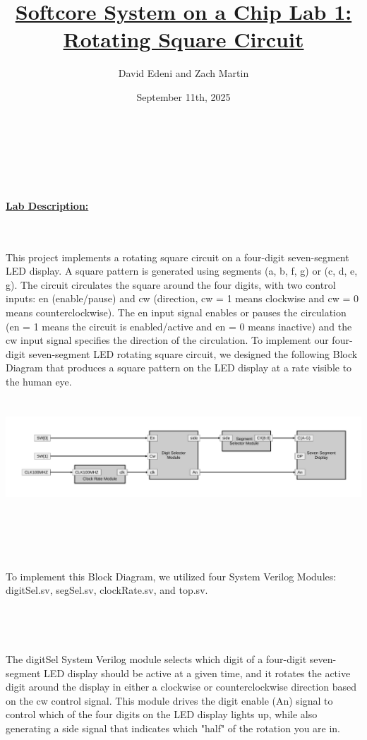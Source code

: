\documentclass[12pt, letterpaper]{article}
\title{
    \underline{\textbf{Softcore System on a Chip Lab 1:}}
    \underline{\textbf{Rotating Square Circuit}} %
   }
\author{David Edeni and Zach Martin}
\date{September 11th, 2025}
\begin{document}
\maketitle
\noindent \\\\\\\\ \underline{\textbf{Lab Description:}}
\maketitle \\\\This project implements a rotating square circuit on a four-digit seven-segment LED display. A square pattern is generated using segments (a, b, f, g) or (c, d, e, g). The circuit circulates the square around the four digits, with two control inputs: en (enable/pause) and cw (direction, cw = 1 means clockwise and cw = 0 means counterclockwise). The en input signal enables or pauses the circulation (en = 1 means the circuit is enabled/active and en = 0 means inactive) and the cw input signal specifies the direction of the circulation.\newpage
\noindent To implement our four-digit seven-segment LED rotating square circuit, we designed the following Block Diagram that produces a square pattern on the LED display at a rate visible to the human eye.\\\\\\
\includegraphics[width=1.2\textwidth]{SOC Project Rotating Square Circuit.pdf}
\\\\\\\\\\\\To implement this Block Diagram, we utilized four System Verilog Modules: digitSel.sv, segSel.sv, clockRate.sv, and top.sv.
\\\\\\\\\\The digitSel System Verilog module selects which digit of a four-digit seven-segment LED display should be active at a given time, and it rotates the active digit around the display in either a clockwise or counterclockwise direction based on the cw control signal. This module drives the digit enable (An) signal to control which of the four digits on the LED display lights up, while also generating a side signal that indicates which "half" of the rotation you are in.\newpage
\end{document}
